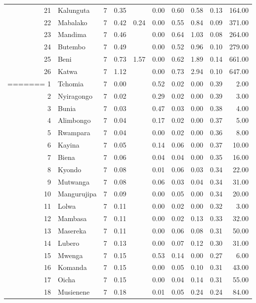 \begin{table}[ht]
\begin{tabular}{rlrrrrrrrr}
  21 & Kalunguta &   7 & 0.35 &  & 0.00 & 0.60 & 0.58 & 0.13 & 164.00 \\ 
  22 & Mabalako &   7 & 0.42 & 0.24 & 0.00 & 0.55 & 0.84 & 0.09 & 371.00 \\ 
  23 & Mandima &   7 & 0.46 &  & 0.00 & 0.64 & 1.03 & 0.08 & 264.00 \\ 
  24 & Butembo &   7 & 0.49 &  & 0.00 & 0.52 & 0.96 & 0.10 & 279.00 \\ 
  25 & Beni &   7 & 0.73 & 1.57 & 0.00 & 0.62 & 1.89 & 0.14 & 661.00 \\ 
  26 & Katwa &   7 & 1.12 &  & 0.00 & 0.73 & 2.94 & 0.10 & 647.00 \\ 
=======
1 & Tchomia &   7 & 0.00 &  & 0.52 & 0.02 & 0.00 & 0.39 & 2.00 \\ 
  2 & Nyiragongo &   7 & 0.02 &  & 0.29 & 0.02 & 0.00 & 0.39 & 3.00 \\ 
  3 & Bunia &   7 & 0.03 &  & 0.47 & 0.03 & 0.00 & 0.38 & 4.00 \\ 
  4 & Alimbongo &   7 & 0.04 &  & 0.17 & 0.02 & 0.00 & 0.37 & 5.00 \\ 
  5 & Rwampara &   7 & 0.04 &  & 0.00 & 0.02 & 0.00 & 0.36 & 8.00 \\ 
  6 & Kayina &   7 & 0.05 &  & 0.14 & 0.06 & 0.00 & 0.37 & 10.00 \\ 
  7 & Biena &   7 & 0.06 &  & 0.04 & 0.04 & 0.00 & 0.35 & 16.00 \\ 
  8 & Kyondo &   7 & 0.08 &  & 0.01 & 0.06 & 0.03 & 0.34 & 22.00 \\ 
  9 & Mutwanga &   7 & 0.08 &  & 0.06 & 0.03 & 0.04 & 0.34 & 31.00 \\ 
  10 & Mangurujipa &   7 & 0.09 &  & 0.00 & 0.05 & 0.00 & 0.34 & 20.00 \\ 
  11 & Lolwa &   7 & 0.11 &  & 0.00 & 0.02 & 0.00 & 0.32 & 3.00 \\ 
  12 & Mambasa &   7 & 0.11 &  & 0.00 & 0.02 & 0.13 & 0.33 & 32.00 \\ 
  13 & Masereka &   7 & 0.11 &  & 0.00 & 0.06 & 0.08 & 0.31 & 50.00 \\ 
  14 & Lubero &   7 & 0.13 &  & 0.00 & 0.07 & 0.12 & 0.30 & 31.00 \\ 
  15 & Mwenga &   7 & 0.15 &  & 0.53 & 0.14 & 0.00 & 0.27 & 6.00 \\ 
  16 & Komanda &   7 & 0.15 &  & 0.00 & 0.05 & 0.10 & 0.31 & 43.00 \\ 
  17 & Oicha &   7 & 0.15 &  & 0.00 & 0.04 & 0.14 & 0.31 & 55.00 \\ 
  18 & Musienene &   7 & 0.18 &  & 0.01 & 0.05 & 0.24 & 0.24 & 84.00 \\ 

\end{tabular}
\end{table}
